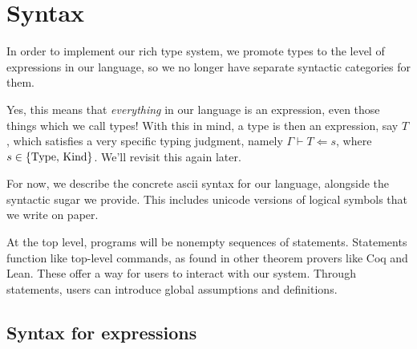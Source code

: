 \documentclass{article}
\begin{document}



\section{Syntax}

In order to implement our rich type system, we promote types to the level of
expressions in our language, so we no longer have separate syntactic categories 
for them.

Yes, this means that \textit{everything} in our language is an expression, even
those things which we call types!
With this in mind, a type is then an expression, say $T$, which satisfies a very
specific typing judgment, namely $\Gamma \vdash T \Leftarrow s$,
where $s \in \{ \operatorname{Type}, \, \operatorname{Kind} \}$. We'll revisit this again later.

For now, we describe the concrete ascii syntax for our language, alongside
the syntactic sugar we provide. This includes unicode versions of logical symbols
that we write on paper.

At the top level, programs will be nonempty sequences of statements.
Statements function like top-level commands, as found in other theorem provers
like Coq and Lean. These offer a way for users to interact with our system.
Through statements, users can introduce global assumptions and definitions.

\subsection{Syntax for expressions}
\end{document}
